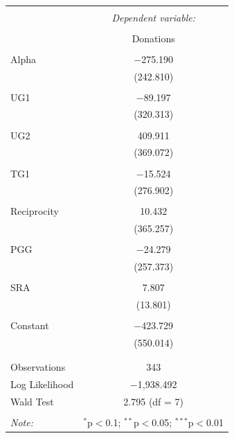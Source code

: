 \documentclass[12pt]{article}
\begin{document}
\begin{table}[!htbp] \centering 
  \caption{} 
  \label{} 
\begin{tabular}{@{\extracolsep{5pt}}lc} 
\\[-1.8ex]\hline 
\hline \\[-1.8ex] 
 & \multicolumn{1}{c}{\textit{Dependent variable:}} \\ 
\cline{2-2} 
\\[-1.8ex] & Donations \\ 
\hline \\[-1.8ex] 
 Alpha & $-$275.190 \\ 
  & (242.810) \\ 
  & \\ 
 UG1 & $-$89.197 \\ 
  & (320.313) \\ 
  & \\ 
 UG2 & 409.911 \\ 
  & (369.072) \\ 
  & \\ 
 TG1 & $-$15.524 \\ 
  & (276.902) \\ 
  & \\ 
 Reciprocity & 10.432 \\ 
  & (365.257) \\ 
  & \\ 
 PGG & $-$24.279 \\ 
  & (257.373) \\ 
  & \\ 
 SRA & 7.807 \\ 
  & (13.801) \\ 
  & \\ 
 Constant & $-$423.729 \\ 
  & (550.014) \\ 
  & \\ 
\hline \\[-1.8ex] 
Observations & 343 \\ 
Log Likelihood & $-$1,938.492 \\ 
Wald Test & 2.795 (df = 7) \\ 
\hline 
\hline \\[-1.8ex] 
\textit{Note:}  & \multicolumn{1}{r}{$^{*}$p$<$0.1; $^{**}$p$<$0.05; $^{***}$p$<$0.01} \\ 
\end{tabular} 
\end{table} 
\end{document}
